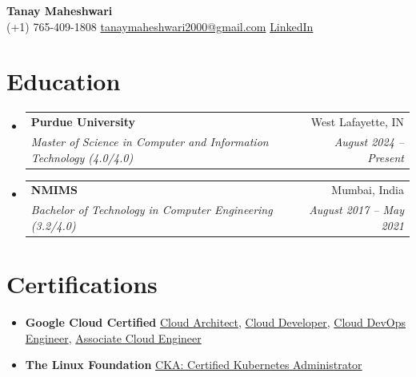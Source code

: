 \documentclass[letterpaper, 11pt]{article}
\makeatletter
\newcommand{\resumeItem}[2]{ \item\small{ \textbf{#1}{ #2 \vspace{-2pt}} } }
\newcommand{\resumeSubheading}[4]{
\vspace{-0.pt}
\item
\begin{tabular*}{0.97\textwidth}{l@{\extracolsep{\fill}}r}
	\textbf{#1}       & #2                 \\
	\textit{\small#3} & \textit{\small #4} \\
\end{tabular*}
\vspace{-5pt}
}
\newcommand{\resumeSubItem}[2]{\resumeItem{#1}{#2}
\vspace{-4pt}}
\newcommand{\resumeSubHeadingListStart}{\begin{itemize}[leftmargin=*,label={}]}
\newcommand{\resumeSubHeadingListEnd}{\end{itemize}}
\makeatother
\begin{document}
	\begin{center}
		{\Huge \textbf{Tanay Maheshwari}} \\[6pt] (+1) 765-409-1808 \quad \textbar
		\quad
		\href{mailto:tanaymaheshwari2000@gmail.com}{tanaymaheshwari2000@gmail.com}
		\quad \textbar \quad
		\href{https://www.linkedin.com/in/tanay-maheshwari-0592986b/}{LinkedIn}
	\end{center}

	\section{Education }
	\resumeSubHeadingListStart \resumeSubheading {Purdue University}{West Lafayette, IN}
	{Master of Science in Computer and Information Technology (4.0/4.0)}{August 2024 -- Present}
	\resumeSubheading {NMIMS}{Mumbai, India} {Bachelor of Technology in Computer Engineering (3.2/4.0)}{August 2017 -- May 2021}
	\resumeSubHeadingListEnd

	\section{Certifications}
	\resumeSubHeadingListStart \resumeSubItem{Google Cloud Certified}
	{\href{https://google.accredible.com/202099b8-c94f-4d96-8ae4-ccb2dc5a3c5a\#gs.05sp92}{Cloud Architect}, \href{https://google.accredible.com/1f4bea53-3ed4-4384-b20a-69fc086320a1}{Cloud Developer}, \href{https://www.credential.net/935f080a-0f43-4cb9-a565-087757953b60?key=20a985781ad16e4369bbbbbc2e9e40b88238781017e6e0157f1bd78f11aed52e}{Cloud DevOps Engineer}, \href{https://www.credential.net/da963177-f534-487e-822c-e75f6c6a0fad?key=e4b6311cebb4b00347575e03aced65654d9e6b383da168c3c54b936dd9130d02}{Associate Cloud Engineer}}

	\resumeSubItem{The Linux Foundation}
	{\href{https://www.credly.com/badges/683a8a38-9098-4e60-996d-628f7a924252/public_url}{CKA: Certified Kubernetes Administrator}}
	\resumeSubHeadingListEnd

\end{document}
